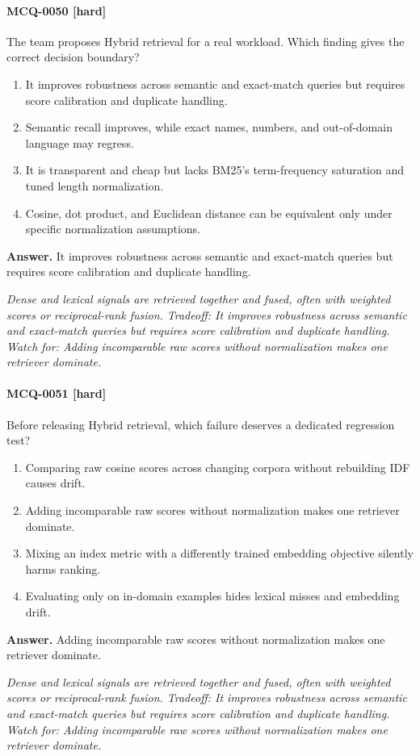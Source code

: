 \paragraph{MCQ-0050 [hard]} The team proposes Hybrid retrieval for a real workload. Which finding gives the correct decision boundary?
\begin{enumerate}[label=\Alph*.]
\item It improves robustness across semantic and exact-match queries but requires score calibration and duplicate handling.
\item Semantic recall improves, while exact names, numbers, and out-of-domain language may regress.
\item It is transparent and cheap but lacks BM25's term-frequency saturation and tuned length normalization.
\item Cosine, dot product, and Euclidean distance can be equivalent only under specific normalization assumptions.
\end{enumerate}
\noindent\textbf{Answer.} It improves robustness across semantic and exact-match queries but requires score calibration and duplicate handling.
\par\textit{Dense and lexical signals are retrieved together and fused, often with weighted scores or reciprocal-rank fusion. Tradeoff: It improves robustness across semantic and exact-match queries but requires score calibration and duplicate handling. Watch for: Adding incomparable raw scores without normalization makes one retriever dominate.}
\paragraph{MCQ-0051 [hard]} Before releasing Hybrid retrieval, which failure deserves a dedicated regression test?
\begin{enumerate}[label=\Alph*.]
\item Comparing raw cosine scores across changing corpora without rebuilding IDF causes drift.
\item Adding incomparable raw scores without normalization makes one retriever dominate.
\item Mixing an index metric with a differently trained embedding objective silently harms ranking.
\item Evaluating only on in-domain examples hides lexical misses and embedding drift.
\end{enumerate}
\noindent\textbf{Answer.} Adding incomparable raw scores without normalization makes one retriever dominate.
\par\textit{Dense and lexical signals are retrieved together and fused, often with weighted scores or reciprocal-rank fusion. Tradeoff: It improves robustness across semantic and exact-match queries but requires score calibration and duplicate handling. Watch for: Adding incomparable raw scores without normalization makes one retriever dominate.}
